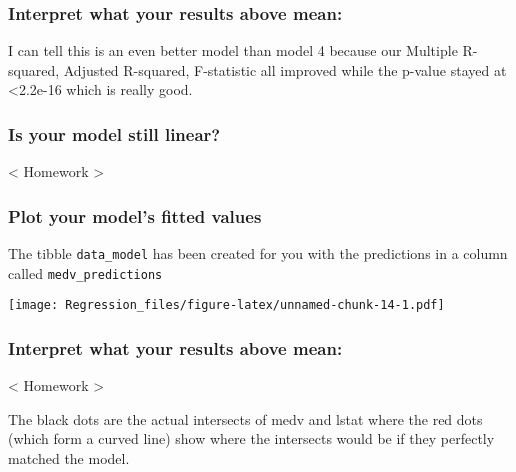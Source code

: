 \documentclass[]{article}
\newenvironment{Shaded}{\begin{snugshade}}{\end{snugshade}}
\newcommand{\DataTypeTok}[1]{\textcolor[rgb]{0.13,0.29,0.53}{#1}}
\newcommand{\DecValTok}[1]{\textcolor[rgb]{0.00,0.00,0.81}{#1}}
\newcommand{\KeywordTok}[1]{\textcolor[rgb]{0.13,0.29,0.53}{\textbf{#1}}}
\newcommand{\NormalTok}[1]{#1}
\newcommand{\OperatorTok}[1]{\textcolor[rgb]{0.81,0.36,0.00}{\textbf{#1}}}
\newcommand{\StringTok}[1]{\textcolor[rgb]{0.31,0.60,0.02}{#1}}
\begin{document}
\hypertarget{interpret-what-your-results-above-mean-5}{%
\subsubsection{Interpret what your results above
mean:}\label{interpret-what-your-results-above-mean-5}}

I can tell this is an even better model than model 4 because our
Multiple R-squared, Adjusted R-squared, F-statistic all improved while
the p-value stayed at \textless{}2.2e-16 which is really good.

\hypertarget{is-your-model-still-linear}{%
\subsubsection{Is your model still
linear?}\label{is-your-model-still-linear}}

\textless{} Homework \textgreater{}

\hypertarget{plot-your-models-fitted-values}{%
\subsubsection{Plot your model's fitted
values}\label{plot-your-models-fitted-values}}

The tibble \texttt{data\_model} has been created for you with the
predictions in a column called \texttt{medv\_predictions}

\begin{Shaded}
\end{Shaded}

\texttt{[image: Regression\_files/figure-latex/unnamed-chunk-14-1.pdf]}

\hypertarget{interpret-what-your-results-above-mean-6}{%
\subsubsection{Interpret what your results above
mean:}\label{interpret-what-your-results-above-mean-6}}

\textless{} Homework \textgreater{}

The black dots are the actual intersects of medv and lstat where the red
dots (which form a curved line) show where the intersects would be if
they perfectly matched the model.
\end{document}
